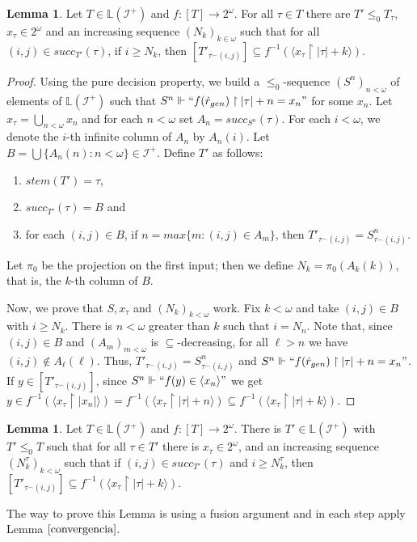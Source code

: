 \documentclass{amsart}
\theoremstyle{definition}
\newtheorem{lemma}[theorem]{Lemma}
\theoremstyle{remark}
\numberwithin{equation}{section}
\newcommand{\li}{\mathbb{L}(\mathcal{I}^+)}
\newcommand{\id}{\mathcal{I}}
\newcommand{\restr}[2]{#1\upharpoonright {#2}}
\begin{document}
\begin{lemma}\label{convergencia}
    Let $T\in \li$ and $f:[T]\rightarrow 2^\omega$. For all $\tau\in T$ there are $T'\leq_0T_\tau$, $x_\tau\in 2^{\omega}$ and an increasing sequence $(N_k)_{k\in\omega}$  such that for all $(i,j)\in succ_{T'}(\tau)$, if $i\geq N_k$, then $[T'_{\tau^\frown(i,j)}]\subseteq f^{-1}(\langle \restr{x_\tau }{|\tau|+k}\rangle)$.
\end{lemma}
\begin{proof}
    Using the pure decision property, we build a $\leq_0$-sequence $(S^n)_{n<\omega}$ of elements of $\li$ such that $S^n\Vdash``\restr{f(\dot r_{gen})}{|\tau|+n}=x_n"$ for some $x_n$. Let $x_\tau=\bigcup_{n<\omega}x_n$ and for each $n<\omega$ set $A_n=succ_{S^n}(\tau)$. For each $i<\omega$, we denote the $i$-th infinite column of $A_n$ by $A_n(i)$. %
    Let $B=\bigcup\{A_n(n):n<\omega\}\in\id^+$.
    Define $T'$ as follows:
    \begin{enumerate}
        \item $stem(T')=\tau$,
        \item $succ_{T'}(\tau)=B$ and
        \item for each $(i,j)\in B$, if $n=max\{m:(i,j)\in A_m\}$, then $T'_{\tau^\frown(i,j)}=S^n_{\tau^\frown(i,j)}$.
    \end{enumerate}

    Let $\pi_0$ be the projection on the first input; then we define $N_k=\pi_0(A_k(k))$, that is, the $k$-th column of $B$.
    
    Now, we prove that $S, x_\tau$ and $(N_k)_{k<\omega}$ work. Fix $k<\omega$ and take $(i,j)\in B$ with $i\geq N_k$. There is $n<\omega$ greater than $k$ such that $i=N_n$. Note that, since $(i,j)\in B$ and $(A_m)_{m<\omega}$ is $\subseteq$-decreasing, for all $\ell>n$ we have $(i,j)\notin A_\ell(\ell)$. Thus, $T'_{\tau^\frown(i,j)}=S^n_{\tau^\frown(i,j)}$ and $S^n\Vdash``\restr{f(\dot r_{gen})}{|\tau|+n}=x_n"$. If $y\in [T'_{\tau^\frown(i,j)}]$, since $S^n\Vdash ``f(y)\in\langle x_n\rangle"$ we get $y\in f^{-1}(\langle\restr{x_\tau}{|x_n|}\rangle)=f^{-1}(\langle\restr{x_\tau}{|\tau|+n}\rangle)\subseteq f^{-1}(\langle\restr{x_\tau}{|\tau|+k}\rangle)$.
\end{proof}

\begin{lemma}\label{convergencia fusión}
    Let $T\in \li$ and $f:[T]\rightarrow 2^\omega$. There is $T'\in \li$ with $T'\leq_0 T$ such that for all $\tau\in T'$ there is $x_\tau\in 2^\omega$, and an increasing sequence $(N_k^\tau)_{k<\omega}$ such that if $(i,j)\in succ_{T'}(\tau)$ and $i\geq N_k^\tau$, then $[T'_{\tau^\frown(i,j)}]\subseteq f^{-1}(\langle\restr{x_\tau}{|\tau|+k}\rangle)$.
\end{lemma}
The way to prove this Lemma is using a fusion argument and in each step apply Lemma $\ref{convergencia}$.
\end{document}
